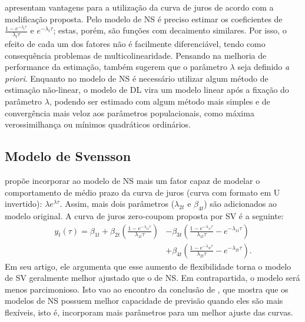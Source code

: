 \documentclass[
	12pt,				%
	openright,			%
	oneside,			%
	a4paper,			%
	english,			%
	brazil				%
	]{dissertacao-ufrgs-abntex2}
\begin{document}
 apresentam vantagens para a utilização da curva de juros
de acordo com a modificação proposta. Pelo modelo de NS é preciso estimar os coeficientes de $\frac{1-e^{-\lambda_{t}\tau}}{\lambda_{t}\tau}$
e $e^{-\lambda_{t}\tau}$; estas, porém, são funções com decaimento similares. Por isso,
o efeito de cada um dos fatores não é facilmente diferenciável,  tendo como consequência problemas de multicolinearidade. 
Pensando na melhoria de performance da estimação,  também sugerem que o parâmetro $\lambda$ seja definido \emph{a priori}. Enquanto no modelo de NS é necessário utilizar algum método de estimação não-linear, o modelo de DL vira um modelo linear após a fixação do parâmetro $\lambda$, podendo ser estimado com algum método mais simples e de convergência mais veloz aos parâmetros populacionais, como máxima verossimilhança ou mínimos quadráticos ordinários. 

\subsection{Modelo de Svensson}

 propõe incorporar ao modelo de NS mais um fator capaz
de modelar o comportamento de médio prazo da curva de juros (curva
com formato em U invertido): $\lambda e^{\lambda\tau}$. Assim, mais dois parâmetros
($\lambda_{2t}$ e $\beta_{4t}$) são adicionados ao modelo original.
A curva de juros zero-coupom proposta por SV é a seguinte:
\begin{equation}
\begin{split}
y_{t}(\tau)=\beta_{1t}+\beta_{2t}\left(\frac{1-e^{-\lambda_{1t}\tau}}{\lambda_{1t}\tau}\right) & -\beta_{3t} \left(\frac{1-e^{-\lambda_{1t}\tau}}{\lambda_{1t}\tau}-e^{-\lambda_{1t}\tau}\right) \\ &
+\beta_{4t}\left(\frac{1-e^{-\lambda_{2t}\tau}}{\lambda_{2t}\tau} - e^{-\lambda_{2t}\tau}\right).
\end{split}
\end{equation}
Em seu artigo, ele argumenta que esse aumento de flexibilidade torna o modelo de SV
geralmente melhor ajustado que o de NS. Em contrapartida, o modelo será menos
parcimonioso. Isto vao ao encontro da conclusão de , que mostra que os modelos de NS possuem
melhor capacidade de previsão quando eles são mais flexíveis, isto é, incorporam mais parâmetros para um melhor ajuste das curvas.
\end{document}
